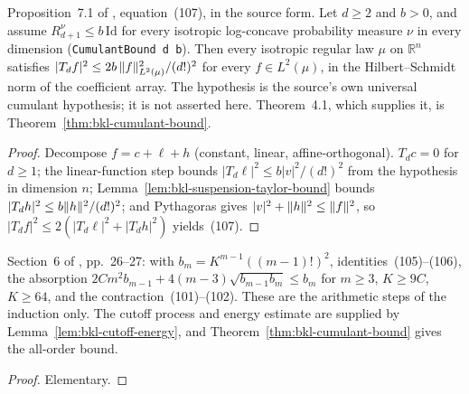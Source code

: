 \begin{proposition}
  \label{prop:bkl-suspension}
  \leanok
  Proposition~7.1 of \cite{BizeulKlartagLehec2026}, equation~(107), in the source form. Let $d\ge2$
  and $b>0$, and assume $R^\nu_{d+1}\le b\,\mathrm{Id}$ for every isotropic log-concave probability
  measure $\nu$ in every dimension (\texttt{CumulantBound d b}). Then every isotropic regular law
  $\mu$ on $\mathbb R^n$ satisfies $|T_df|^2\le 2b\,\lVert f\rVert_{L^2(\mu)}^2/(d!)^2$ for every
  $f\in L^2(\mu)$, in the Hilbert--Schmidt norm of the coefficient array. The hypothesis is the
  source's own universal cumulant hypothesis; it is not asserted here. Theorem~4.1, which
  supplies it, is Theorem~\ref{thm:bkl-cumulant-bound}.
\end{proposition}
\begin{proof}
  \leanok
  Decompose $f=c+\ell+h$ (constant, linear, affine-orthogonal). $T_dc=0$ for $d\ge1$; the
  linear-function step bounds $|T_d\ell|^2\le b|v|^2/(d!)^2$ from the hypothesis in dimension $n$;
  Lemma~\ref{lem:bkl-suspension-taylor-bound} bounds $|T_dh|^2\le b\lVert h\rVert^2/(d!)^2$; and
  Pythagoras gives $|v|^2+\lVert h\rVert^2\le\lVert f\rVert^2$, so $|T_df|^2\le2(|T_d\ell|^2+|T_dh|^2)$ yields~(107).
\end{proof}

\begin{lemma}
  \label{lem:bkl-cumulant-envelope}
  \leanok
  Section~6 of \cite{BizeulKlartagLehec2026}, pp.~26--27: with $b_m=K^{m-1}((m-1)!)^2$,
  identities~(105)--(106), the absorption $2Cm^2b_{m-1}+4(m-3)\sqrt{b_{m-1}b_m}\le b_m$ for
  $m\ge3$, $K\ge9C$, $K\ge64$, and the contraction~(101)--(102). These are the arithmetic steps
  of the induction only. The cutoff process and energy estimate are supplied by Lemma~\ref{lem:bkl-cutoff-energy}, and Theorem~\ref{thm:bkl-cumulant-bound} gives the all-order bound.
\end{lemma}
\begin{proof}
  \leanok
  Elementary.
\end{proof}

